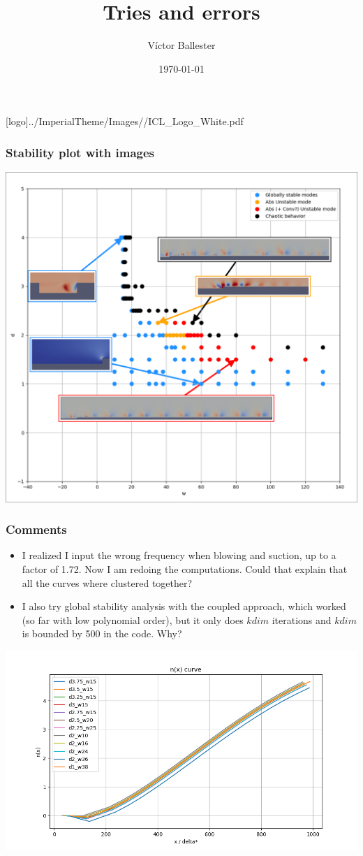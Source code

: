 \documentclass[
  aspectratio=169, %
  t, %
  onlytextwidth, %
  10pt, %
]{beamer}
\title{Tries and errors} %
\subtitle{} %
\author{Víctor Ballester} %
\date{\today} %
\def\imagefolder{../ImperialTheme/Images/}
\begin{document}
\begingroup
{} %
[logo]{\imagefolder/ICL_Logo_White.pdf} %
\frame[plain, s]{\titlepage} %
\endgroup

\begin{frame}
	\frametitle{Stability plot with images}
	\centering
	\includegraphics[width=0.5\linewidth]{Images/stabilitycurve.png}
\end{frame}

\begin{frame}
	\frametitle{Comments}
	\begin{itemize}
	  \item I realized I input the wrong frequency when blowing and suction, up to a factor of 1.72. Now I am redoing the computations. Could that explain that all the curves where clustered together?
	  \item I also try global stability analysis with the coupled approach, which worked (so far with low polynomial order), but it only does $kdim$ iterations and $kdim$ is bounded by 500 in the code. Why?
	\end{itemize}	
	\centering
	\includegraphics[width=0.5\linewidth]{Images/nfactorCurve.png}
\end{frame}
\end{document}
